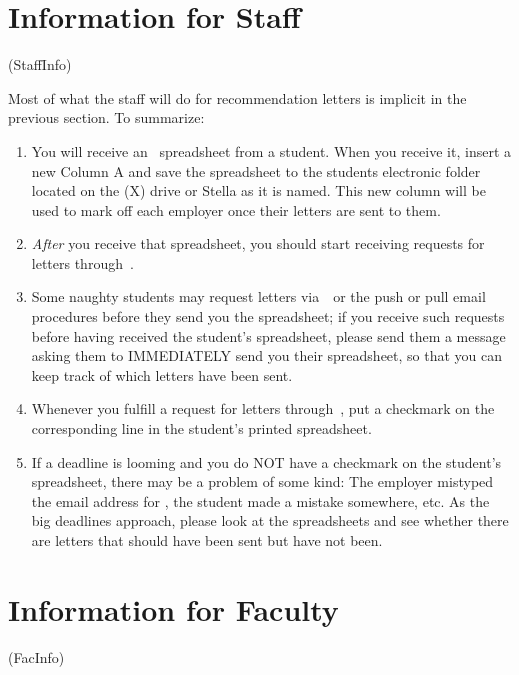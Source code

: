 \documentclass{\econtex}
\begin{document}
\section{Information for Staff}\ifdvi\hypertarget{StaffInfo}{(StaffInfo)}\fi

Most of what the staff will do for recommendation letters is implicit in the previous section.  To
summarize:
\begin{enumerate}
\item You will receive an \EMtt~spreadsheet from a student.  When you receive it, insert a new Column A and save the spreadsheet to the students electronic folder located on the (X) drive or Stella as it is named. This new column will be used to mark off each employer once their letters are sent to them.
\item \textit{After} you receive that spreadsheet, you should start receiving requests for letters through~\jmstaffemail.  
\item Some naughty students may request letters via~\EJM~or the push or pull email procedures before they send you the spreadsheet; if you receive such requests before having received the student's spreadsheet, please send them a message asking them to IMMEDIATELY send you their spreadsheet, so that you can keep track of which letters have been sent.
\item Whenever you fulfill a request for letters through~\jmstaffemail, put a checkmark on the corresponding line in the student's printed spreadsheet.
\item If a deadline is looming and you do NOT have a checkmark on the student's spreadsheet, there may be a problem of some kind: The employer mistyped the email address for \jmstaffemail, the student made a mistake somewhere, etc.  As the big deadlines approach, please look at the spreadsheets and see whether there are letters that should have been sent but have not been.
\end{enumerate}

\section{Information for Faculty}\ifdvi\hypertarget{FacInfo}{(FacInfo)}\fi
\end{document}
